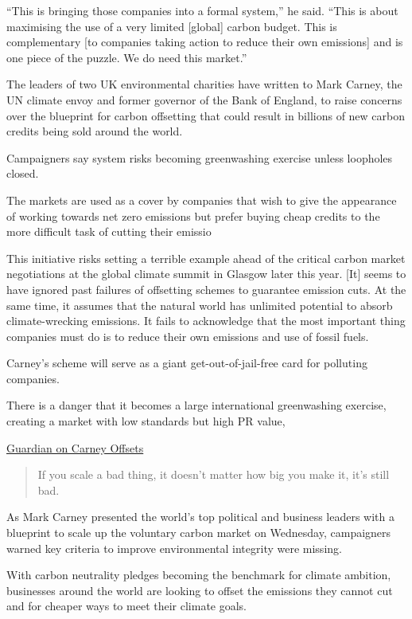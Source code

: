 \documentclass[
]{book}
\begin{document}
``This is bringing those companies into a formal system,'' he said. ``This is about maximising the use of a very limited {[}global{]} carbon budget. This is complementary {[}to companies taking action to reduce their own emissions{]} and is one piece of the puzzle. We do need this market.''

The leaders of two UK environmental charities have written to Mark Carney, the UN climate envoy and former governor of the Bank of England, to raise concerns over the blueprint for carbon offsetting that could result in billions of new carbon credits being sold around the world.

Campaigners say system risks becoming greenwashing exercise unless loopholes closed.

The markets are used as a cover by companies that wish to give the appearance of working towards net zero emissions but prefer buying cheap credits to the more difficult task of cutting their emissio

This initiative risks setting a terrible example ahead of the critical carbon market negotiations at the global climate summit in Glasgow later this year. {[}It{]} seems to have ignored past failures of offsetting schemes to guarantee emission cuts. At the same time, it assumes that the natural world has unlimited potential to absorb climate-wrecking emissions. It fails to acknowledge that the most important thing companies must do is to reduce their own emissions and use of fossil fuels.

Carney's scheme will serve as a giant get-out-of-jail-free card for polluting companies.

There is a danger that it becomes a large international greenwashing exercise, creating a market with low standards but high PR value,

\href{https://www.theguardian.com/environment/2021/jan/27/green-groups-raise-concerns-over-carney-carbon-credits-plan}{Guardian on Carney Offsets}

\begin{quote}
If you scale a bad thing, it doesn't matter how big you make it, it's still bad.
\end{quote}

As Mark Carney presented the world's top political and business leaders with a blueprint to scale up the voluntary carbon market on Wednesday, campaigners warned key criteria to improve environmental integrity were missing.

With carbon neutrality pledges becoming the benchmark for climate ambition, businesses around the world are looking to offset the emissions they cannot cut and for cheaper ways to meet their climate goals.
\end{document}
